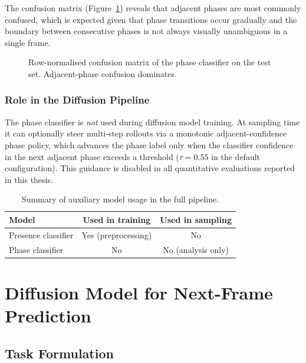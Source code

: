 \documentclass[12pt, a4paper, twoside]{report}
\begin{document}
The confusion matrix (Figure~\ref{fig:confusion_matrix}) reveals that
adjacent phases are most commonly confused, which is expected given that
phase transitions occur gradually and the boundary between consecutive phases
is not always visually unambiguous in a single frame.

\begin{figure}[H]
\centering
\caption{Row-normalised confusion matrix of the phase classifier on the test
         set. Adjacent-phase confusion dominates.}
\label{fig:confusion_matrix}
\end{figure}

\subsection{Role in the Diffusion Pipeline}
\label{ssec:phase_role}

The phase classifier is \emph{not} used during diffusion model training.
At sampling time it can optionally steer multi-step rollouts via a monotonic
adjacent-confidence phase policy, which advances the phase label only when
the classifier confidence in the next adjacent phase exceeds a threshold
($\tau = 0.55$ in the default configuration).
This guidance is disabled in all quantitative evaluations reported in this
thesis.

\begin{table}[H]
\centering
\caption{Summary of auxiliary model usage in the full pipeline.}
\label{tab:auxiliary_summary}
\begin{tabular}{lcc}
\toprule
\textbf{Model} & \textbf{Used in training} & \textbf{Used in sampling} \\
\midrule
Presence classifier & Yes (preprocessing) & No \\
Phase classifier    & No                  & No (analysis only) \\
\bottomrule
\end{tabular}
\end{table}

\chapter{Diffusion Model for Next-Frame Prediction}
\label{chap:diffusion}

\section{Task Formulation}
\label{sec:diff_task}
\end{document}
